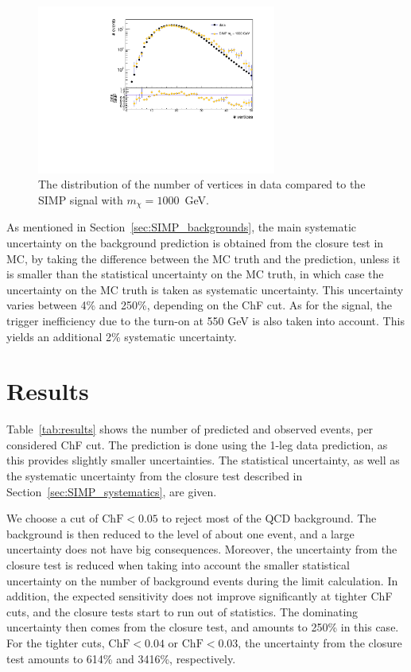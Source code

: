 \begin{figure}[h]
  \centering
  \includegraphics[width=0.7\textwidth]{figures/PU_reweighting_SIMP_M-1000.pdf}\hfill%
  \caption{The distribution of the number of vertices in data compared to the SIMP signal with $m_{\chi} = 1000$~GeV.}
  \label{fig:PU}
\end{figure}

As mentioned in Section~\ref{sec:SIMP_backgrounds}, the main systematic uncertainty on the background prediction is obtained from the closure test in MC, by taking the difference between the MC truth and the prediction, unless it is smaller than the statistical uncertainty on the MC truth, in which case the uncertainty on the MC truth is taken as systematic uncertainty. This uncertainty varies between 4\% and 250\%, depending on the ChF cut. As for the signal, the trigger inefficiency due to the turn-on at 550 GeV is also taken into account.  This yields an additional 2\% systematic uncertainty.

\section{Results}

Table~\ref{tab:results} shows the number of predicted and observed events, per considered ChF cut. The prediction is done using the 1-leg data prediction, as this provides slightly smaller uncertainties. The statistical uncertainty, as well as the systematic uncertainty from the closure test described in Section~\ref{sec:SIMP_systematics}, are given.

We choose a cut of $\mathrm{ChF} < 0.05$ to reject most of the QCD background. The background is then reduced to the level of about one event, and a large uncertainty does not have big consequences. Moreover, the uncertainty from the closure test is reduced when taking into account the smaller statistical uncertainty on the number of background events during the limit calculation. In addition, the expected sensitivity does not improve significantly at tighter ChF cuts, and the closure tests start to run out of statistics. The dominating uncertainty then comes from the closure test, and amounts to 250\% in this case. For the tighter cuts, $\mathrm{ChF} < 0.04$ or $\mathrm{ChF} < 0.03$, the uncertainty from the closure test amounts to 614\% and 3416\%, respectively.

